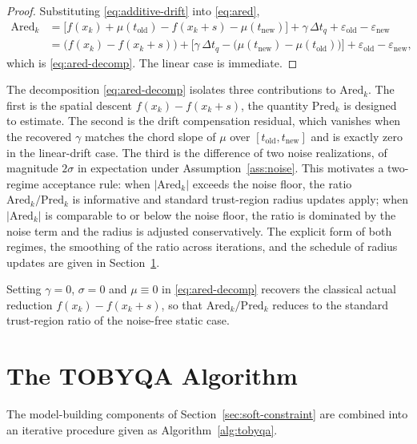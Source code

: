 \documentclass[11pt,a4paper]{article}
\begin{document}
\begin{proof}
Substituting \eqref{eq:additive-drift} into \eqref{eq:ared},
\begin{align*}
  \mathrm{Ared}_k
  &= \bigl[f(x_k) + \mu(t_{\mathrm{old}})
     - f(x_k+s) - \mu(t_{\mathrm{new}})\bigr]
     + \gamma\,\Delta t_q
     + \varepsilon_{\mathrm{old}} - \varepsilon_{\mathrm{new}} \\
  &= \bigl(f(x_k) - f(x_k+s)\bigr)
     + \bigl[\gamma\,\Delta t_q
             - \bigl(\mu(t_{\mathrm{new}}) -
                     \mu(t_{\mathrm{old}})\bigr)\bigr]
     + \varepsilon_{\mathrm{old}} - \varepsilon_{\mathrm{new}},
\end{align*}
which is \eqref{eq:ared-decomp}. The linear case is immediate.
\end{proof}

The decomposition \eqref{eq:ared-decomp} isolates three
contributions to $\mathrm{Ared}_k$. The first is the spatial
descent $f(x_k) - f(x_k + s)$, the quantity $\mathrm{Pred}_k$ is
designed to estimate. The second is the drift compensation
residual, which vanishes when the recovered $\gamma$ matches the
chord slope of $\mu$ over $[t_{\mathrm{old}}, t_{\mathrm{new}}]$
and is exactly zero in the linear-drift case. The third is the
difference of two noise realizations, of magnitude $2\sigma$ in
expectation under Assumption~\ref{ass:noise}. This motivates a
two-regime acceptance rule: when $|\mathrm{Ared}_k|$ exceeds the
noise floor, the ratio $\mathrm{Ared}_k/\mathrm{Pred}_k$ is
informative and standard trust-region radius updates apply; when
$|\mathrm{Ared}_k|$ is comparable to or below the noise floor, the
ratio is dominated by the noise term and the radius is adjusted
conservatively. The explicit form of both regimes, the smoothing
of the ratio across iterations, and the schedule of radius updates
are given in Section~\ref{sec:algorithm}.

Setting $\gamma = 0$, $\sigma = 0$ and $\mu \equiv 0$ in
\eqref{eq:ared-decomp} recovers the classical actual reduction
$f(x_k) - f(x_k + s)$, so that $\mathrm{Ared}_k/\mathrm{Pred}_k$
reduces to the standard trust-region ratio of the noise-free
static case.

\section{The TOBYQA Algorithm}
\label{sec:algorithm}

The model-building components of
Section~\ref{sec:soft-constraint} are combined into an iterative
procedure given as Algorithm~\ref{alg:tobyqa}.
\end{document}
